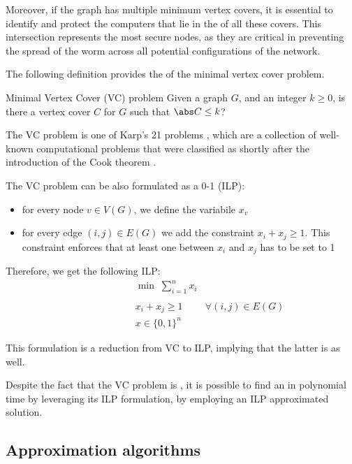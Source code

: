 \documentclass[a4paper, 12pt]{report}
\begin{document}
    Moreover, if the graph has multiple minimum vertex covers, it is essential to identify and protect  the computers that lie in the  of all these covers. This intersection represents the most secure nodes, as they are critical in preventing the spread of the worm across all potential configurations of the network.

    The following definition provides the  of the minimal vertex cover problem.

    \begin{frameddefn}{Minimal Vertex Cover (VC) problem}
        Given a graph $G$, and an integer $k \ge 0$, is there a vertex cover $C$ for $G$ such that $\abs C \le k$?
    \end{frameddefn}

    The VC problem is one of Karp's 21 \NPComplete problems \cite{karp}, which are a collection of well-known computational problems that were classified as \NPComplete shortly after the introduction of the Cook theorem \cite{cook}.

    The VC problem can be also formulated as a 0-1  (ILP):
    \begin{itemize}
        \item for every node $v \in V(G)$, we define the variabile $x_v$
        \item for every edge $(i,j) \in E(G)$ we add the constraint $x_i + x_j \geq 1$. This constraint enforces that at least one between $x_i$ and $x_j$ has to be set to 1
    \end{itemize}

    Therefore, we get the following ILP:
    \[\begin{array}{ccc}
        \qquad\qquad\quad
        & \min \; \sum\limits_{i = 1}^n x_i \\\\
        & x_i + x_j \geq 1 & \forall (i,j) \in E(G) \\
        & x \in \{0,1\}^n
    \end{array}\]

    This formulation is a reduction from VC to ILP, implying that the latter is \NPComplete as well.

    Despite the fact that the VC problem is \NPComplete, it is possible to find an  in polynomial time by leveraging its ILP formulation, by employing an ILP approximated solution.

    \subsection{Approximation algorithms}
\end{document}
